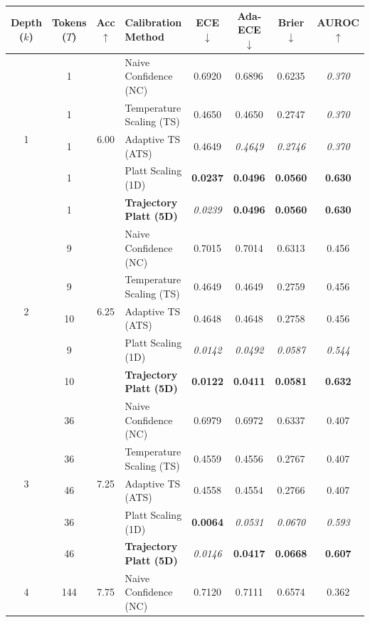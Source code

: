 \begin{table}[t]
\setlength{\tabcolsep}{4pt}
\renewcommand{\arraystretch}{1.05}
\centering
\footnotesize
\begin{tabular}{ccclcccc}
\toprule
\textbf{Depth ($k$)} & \textbf{Tokens ($T$)} & \textbf{Acc} $\uparrow$ & \textbf{Calibration Method} & \textbf{ECE} $\downarrow$ & \textbf{Ada-ECE} $\downarrow$ & \textbf{Brier} $\downarrow$ & \textbf{AUROC} $\uparrow$ \\
\midrule
\multirow{5}{*}{1} & 1 & \multirow{5}{*}{6.00} & Naive Confidence (NC) & 0.6920 & 0.6896 & 0.6235 & \textit{0.370} \\
 & 1 &  & Temperature Scaling (TS) & 0.4650 & 0.4650 & 0.2747 & \textit{0.370} \\
 & 1 &  & Adaptive TS (ATS) & 0.4649 & \textit{0.4649} & \textit{0.2746} & \textit{0.370} \\
 & 1 &  & Platt Scaling (1D) & \textbf{0.0237} & \textbf{0.0496} & \textbf{0.0560} & \textbf{0.630} \\
 & 1 &  & \textbf{Trajectory Platt (5D)} & \textit{0.0239} & \textbf{0.0496} & \textbf{0.0560} & \textbf{0.630} \\
\midrule
\multirow{5}{*}{2} & 9 & \multirow{5}{*}{6.25} & Naive Confidence (NC) & 0.7015 & 0.7014 & 0.6313 & 0.456 \\
 & 9 &  & Temperature Scaling (TS) & 0.4649 & 0.4649 & 0.2759 & 0.456 \\
 & 10 &  & Adaptive TS (ATS) & 0.4648 & 0.4648 & 0.2758 & 0.456 \\
 & 9 &  & Platt Scaling (1D) & \textit{0.0142} & \textit{0.0492} & \textit{0.0587} & \textit{0.544} \\
 & 10 &  & \textbf{Trajectory Platt (5D)} & \textbf{0.0122} & \textbf{0.0411} & \textbf{0.0581} & \textbf{0.632} \\
\midrule
\multirow{5}{*}{3} & 36 & \multirow{5}{*}{7.25} & Naive Confidence (NC) & 0.6979 & 0.6972 & 0.6337 & 0.407 \\
 & 36 &  & Temperature Scaling (TS) & 0.4559 & 0.4556 & 0.2767 & 0.407 \\
 & 46 &  & Adaptive TS (ATS) & 0.4558 & 0.4554 & 0.2766 & 0.407 \\
 & 36 &  & Platt Scaling (1D) & \textbf{0.0064} & \textit{0.0531} & \textit{0.0670} & \textit{0.593} \\
 & 46 &  & \textbf{Trajectory Platt (5D)} & \textit{0.0146} & \textbf{0.0417} & \textbf{0.0668} & \textbf{0.607} \\
\midrule
\multirow{5}{*}{4} & 144 & \multirow{5}{*}{7.75} & Naive Confidence (NC) & 0.7120 & 0.7111 & 0.6574 & 0.362 \\

\end{tabular}
\end{table}
